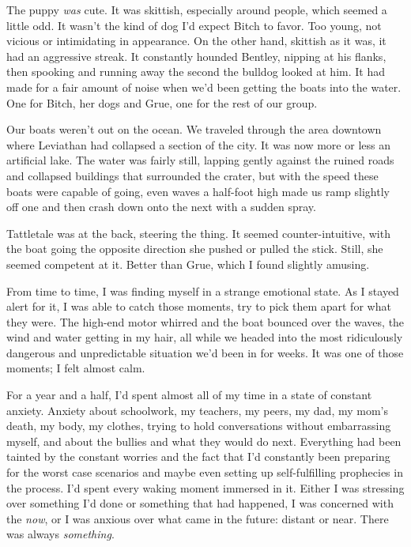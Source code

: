 The puppy \emph{was} cute.  It was skittish, especially around people, which seemed a little odd.  It wasn't the kind of dog I'd expect Bitch to favor.  Too young, not vicious or intimidating in appearance.  On the other hand, skittish as it was, it had an aggressive streak.  It constantly hounded Bentley, nipping at his flanks, then spooking and running away the second the bulldog looked at him.  It had made for a fair amount of noise when we'd been getting the boats into the water.  One for Bitch, her dogs and Grue, one for the rest of our group.



Our boats weren't out on the ocean.  We traveled through the area downtown where Leviathan had collapsed a section of the city.  It was now more or less an artificial lake.  The water was fairly still, lapping gently against the ruined roads and collapsed buildings that surrounded the crater, but with the speed these boats were capable of going, even waves a half-foot high made us ramp slightly off one and then crash down onto the next with a sudden spray.



Tattletale was at the back, steering the thing.  It seemed counter-intuitive, with the boat going the opposite direction she pushed or pulled the stick.  Still, she seemed competent at it.  Better than Grue, which I found slightly amusing.



From time to time, I was finding myself in a strange emotional state.  As I stayed alert for it, I was able to catch those moments, try to pick them apart for what they were.  The high-end motor whirred and the boat bounced over the waves, the wind and water getting in my hair, all while we headed into the most ridiculously dangerous and unpredictable situation we'd been in for weeks. It was one of those moments; I felt almost calm.



For a year and a half, I'd spent almost all of my time in a state of constant anxiety.  Anxiety about schoolwork, my teachers, my peers, my dad, my mom's death, my body, my clothes, trying to hold conversations without embarrassing myself, and about the bullies and what they would do next.  Everything had been tainted by the constant worries and the fact that I'd constantly been preparing for the worst case scenarios and maybe even setting up self-fulfilling prophecies in the process.  I'd spent every waking moment immersed in it.  Either I was stressing over something I'd done or something that had happened, I was concerned with the \emph{now}, or I was anxious over what came in the future: distant or near.  There was always \emph{something}.



